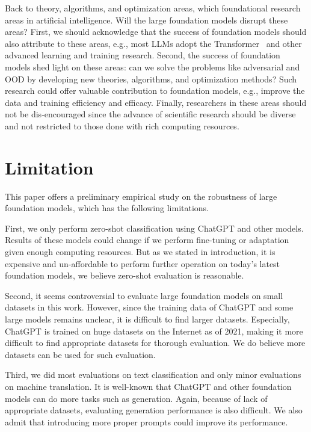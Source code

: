 \documentclass[11pt]{article}
\newcommand{\chat}{ChatGPT\xspace}
\begin{document}
Back to theory, algorithms, and optimization areas, which foundational research areas in artificial intelligence.
Will the large foundation models disrupt these areas?
First, we should acknowledge that the success of foundation models should also attribute to these areas, e.g., most LLMs adopt the Transformer~\cite{vaswani2017attention} and other advanced learning and training research.
Second, the success of foundation models shed light on these areas: can we solve the problems like adversarial and OOD by developing new theories, algorithms, and optimization methods?
Such research could offer valuable contribution to foundation models, e.g., improve the data and training efficiency and efficacy.
Finally, researchers in these areas should not be dis-encouraged since the advance of scientific research should be diverse and not restricted to those done with rich computing resources.









\section{Limitation}

This paper offers a preliminary empirical study on the robustness of large foundation models, which has the following limitations.

First, we only perform zero-shot classification using \chat and other models.
Results of these models could change if we perform fine-tuning or adaptation given enough computing resources.
But as we stated in introduction, it is expensive and un-affordable to perform further operation on today's latest foundation models, we believe zero-shot evaluation is reasonable.

Second, it seems controversial to evaluate large foundation models on small datasets in this work.
However, since the training data of \chat and some large models remains unclear, it is difficult to find larger datasets.
Especially, \chat is trained on huge datasets on the Internet as of 2021, making it more difficult to find appropriate datasets for thorough evaluation.
We do believe more datasets can be used for such evaluation.

Third, we did most evaluations on text classification and only minor evaluations on machine translation.
It is well-known that \chat and other foundation models can do more tasks such as generation.
Again, because of lack of appropriate datasets, evaluating generation performance is also difficult.
We also admit that introducing more proper prompts could improve its performance.
\end{document}
